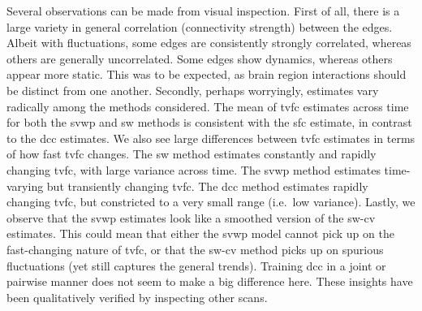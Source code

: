 Several observations can be made from visual inspection.
%
First of all, there is a large variety in general correlation (connectivity strength) between the edges.
Albeit with fluctuations, some edges are consistently strongly correlated, whereas others are generally uncorrelated.
Some edges show dynamics, whereas others appear more static.
This was to be expected, as brain region interactions should be distinct from one another.
%
Secondly, perhaps worryingly, estimates vary radically among the methods considered.
The mean of \gls{tvfc} estimates across time for both the \gls{svwp} and \gls{sw} methods is consistent with the \gls{sfc} estimate, in contrast to the \gls{dcc} estimates.
We also see large differences between \gls{tvfc} estimates in terms of how fast \gls{tvfc} changes.
The \gls{sw} method estimates constantly and rapidly changing \gls{tvfc}, with large variance across time.
The \gls{svwp} method estimates time-varying but transiently changing \gls{tvfc}.
The \gls{dcc} method estimates rapidly changing \gls{tvfc}, but constricted to a very small range (i.e.~low variance).
%
Lastly, we observe that the \gls{svwp} estimates look like a smoothed version of the \gls{sw-cv} estimates.
This could mean that either the \gls{svwp} model cannot pick up on the fast-changing nature of \gls{tvfc}, or that the \gls{sw-cv} method picks up on spurious fluctuations (yet still captures the general trends).
Training \gls{dcc} in a joint or pairwise manner does not seem to make a big difference here.
%
These insights have been qualitatively verified by inspecting other scans.



